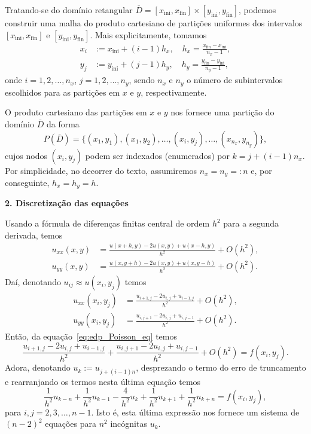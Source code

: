 Tratando-se do domínio retangular $\overline{D} = [x_{\text{ini}}, x_{\text{fin}}]\times [y_{\text{ini}}, y_{\text{fin}}]$, podemos construir uma malha do produto cartesiano de partições uniformes dos intervalos $[x_{\text{ini}}, x_{\text{fin}}]$ e $[y_{\text{ini}}, y_{\text{fin}}]$. Mais explicitamente, tomamos
\begin{align}
  x_{i} &:= x_{\text{ini}} + (i-1)h_x,\quad h_x = \frac{x_{\text{fin}}-x_{\text{ini}}}{n_x-1},\\
  y_{j} &:= y_{\text{ini}} + (j-1)h_y,\quad h_y = \frac{y_{\text{fin}}-y_{\text{ini}}}{n_y-1},  
\end{align}
onde $i = 1, 2, \dotsc, n_x$, $j = 1, 2, \dotsc, n_y$, sendo $n_x$ e $n_y$ o número de subintervalos escolhidos para as partições em $x$ e $y$, respectivamente.

O produto cartesiano das partições em $x$ e $y$ nos fornece uma partição do domínio $\overline{D}$ da forma
\begin{equation}
  P(\overline{D}) = \{(x_1, y_1), (x_1, y_2), \dotsc, (x_i, y_j), \dotsc, (x_{n_x}, y_{n_y})\},
\end{equation}
cujos nodos $(x_i, y_j)$ podem ser indexados (enumerados) por $k = j + (i-1)n_x$.  Por simplicidade, no decorrer do texto, assumiremos $n_x=n_y=:n$ e, por conseguinte, $h_x=h_y=h$.

\begin{flushleft}
  {\bf 2. Discretização das equações}
\end{flushleft}

Usando a fórmula de diferenças finitas central de ordem $h^2$ para a segunda derivada, temos
\begin{align}
  u_{xx}(x,y) &= \frac{u(x+h,y)-2u(x,y)+u(x-h,y)}{h^2} + O(h^2),\\
  u_{yy}(x,y) &= \frac{u(x,y+h)-2u(x,y)+u(x,y-h)}{h^2} + O(h^2).
\end{align}
Daí, denotando $u_{ij}\approx u(x_i, y_j)$ temos
\begin{align}
  u_{xx}(x_i,y_j) &= \frac{u_{i+1,j}-2u_{i,j}+u_{i-1,j}}{h^2} + O(h^2),\\
  u_{yy}(x_i,y_j) &= \frac{u_{i,j+1}-2u_{i,j}+u_{i,j-1}}{h^2} + O(h^2).  
\end{align}
Então, da equação~\ref{eq:edp_Poisson_eq} temos
\begin{equation}
  \frac{u_{i+1,j}-2u_{i,j}+u_{i-1,j}}{h^2} + \frac{u_{i,j+1}-2u_{i,j}+u_{i,j-1}}{h^2} + O(h^2) = f(x_i,y_j).
\end{equation}
Adora, denotando $u_k := u_{j+(i-1)n}$, desprezando o termo do erro de truncamento e rearranjando os termos nesta última equação temos
\begin{equation}\label{eq:edp_Poisson_mdf_sis0}
  \frac{1}{h^2}u_{k-n} + \frac{1}{h^2}u_{k-1} -\frac{4}{h^2}u_{k} + \frac{1}{h^2}u_{k+1} + \frac{1}{h^2}u_{k+n} = f(x_i,y_j),
\end{equation}
para $i,j=2, 3, \dotsc, n-1$. Isto é, esta última expressão nos fornece um sistema de $(n-2)^2$ equações para $n^2$ incógnitas $u_k$.

